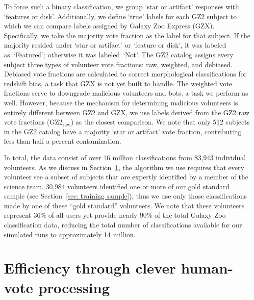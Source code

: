 \documentclass[twocolumn]{aastex6}
\newcommand{\feat}{`Featured'}
\newcommand{\notfeat}{`Not'}
\newcommand{\raw}{GZ2$_{\text{raw}}$}
\begin{document}
To force such a binary classification, we group `star or artifact' responses with 
`features or disk'.  Additionally, we define `true' labels for each GZ2 subject to 
which we can compare labels assigned by Galaxy Zoo Express (GZX).   
Specifically, we take the majority vote fraction as the label for that subject. 
If the majority resided under `star or artifact' or `feature or disk', it was labeled as~\feat; 
otherwise it was labeled~\notfeat.
The GZ2 catalog assigns every subject three types of volunteer vote fractions: 
raw, weighted, and debiased. 
Debiased vote fractions are calculated to correct morphological classifications
for redshift bias, a task that GZX is not yet built to handle. 
The weighted vote fractions serve to downgrade malicious volunteers and bots, 
a task we perform as well. However, because the mechanism for
determining malicious volunteers is entirely different between GZ2 and GZX, 
we use labels derived from the GZ2 raw vote fractions (\raw) as the closest comparison. 
 We note that only 512 subjects in the GZ2 catalog have a majority `star or artifact' vote 
fraction, contributing less than half a percent contamination. 

In total, the data consist of over 16 million classifications from 83,943 individual volunteers. 
As we discuss in Section~\ref{sec: SWAP}, the algorithm we use requires that every 
volunteer see a subset of subjects that are expertly identified by a member of the science team. 
30,984 volunteers identified one or more of our gold standard sample (see Section~\ref{sec: training sample}), thus we use only those classifications made by one of these ``gold standard'' volunteers. 
We note that these volunteers represent 36\% of all users 
yet provide nearly 90\% of the total Galaxy Zoo classification data, reducing the 
total number of classifications available for our simulated runs to approximately 14 million.





\section{Efficiency through clever human-vote processing}\label{sec: SWAP}
\end{document}

